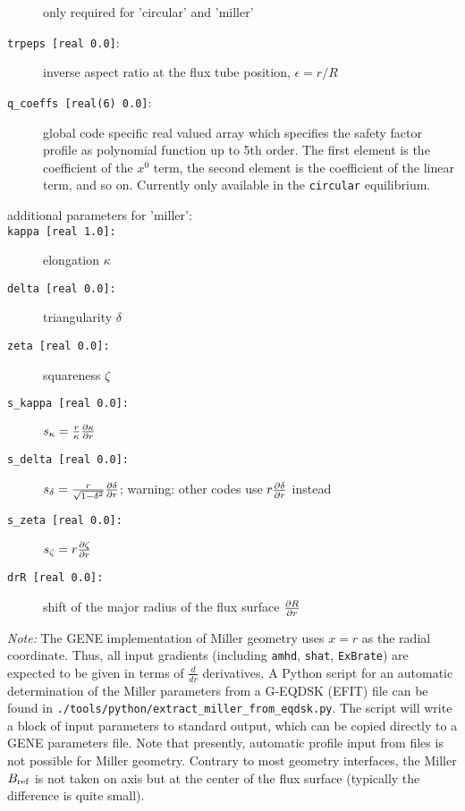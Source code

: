 \documentclass[12pt]{article}
\begin{document}
\begin{description}
 only required for 'circular' and 'miller'
\item[\hypertarget{trpeps}{\texttt{trpeps [real 0.0]}}:] inverse aspect ratio at the flux tube position, $\epsilon=r/R$
\item[\hypertarget{q_coeffs}{\texttt{q\_coeffs [real(6) 0.0]}}:] global code specific real valued array which specifies the safety factor profile as
polynomial function up to 5th order. The first element is the coefficient of the $x^0$ term, the second element is the coefficient of the linear term,
and so on. Currently only available in the {\tt circular} equilibrium.
%
\item[additional parameters for \hypertarget{desc:miller}{'miller'}:]
\item[\texttt{kappa [real 1.0]:}] elongation $\kappa$
\item[\texttt{delta [real 0.0]:}] triangularity $\delta$
\item[\texttt{zeta [real 0.0]:}] squareness $\zeta$
\item[\texttt{s\_kappa [real 0.0]:}] $s_\kappa = \frac{r}{\kappa} \frac{\partial \kappa}{\partial r}$
\item[\texttt{s\_delta [real 0.0]:}] $s_\delta = \frac{r}{\sqrt{1-\delta^2}} \frac{\partial \delta}{\partial r}$; warning: other codes use $r \frac{\partial \delta}{\partial r}$ instead
\item[\texttt{s\_zeta [real 0.0]:}]  $s_\zeta = r \frac{\partial \zeta}{\partial r}$
\item[\texttt{drR [real 0.0]:}] shift of the major radius of the flux surface $\frac{\partial R}{\partial r}$
\end{description}
{\em Note:} The GENE implementation of Miller geometry uses $x=r$ as the radial coordinate.
Thus, all input gradients (including {\tt amhd}, {\tt shat}, {\tt ExBrate}) are expected to be
given in terms of $\frac{d}{dr}$ derivatives. A Python script for an automatic determination of
the Miller parameters from a G-EQDSK (EFIT) file can be found in {\tt ./tools/python/extract\_miller\_from\_eqdsk.py}.
The script will write a block of input parameters to standard output, which can be copied directly
to a GENE parameters file. Note that presently, automatic profile input from files is not possible for Miller geometry.
Contrary to most geometry interfaces, the Miller $B_{\rm ref}$ is not taken on axis but at the center
of the flux surface (typically the difference is quite small).
%
\end{document}
